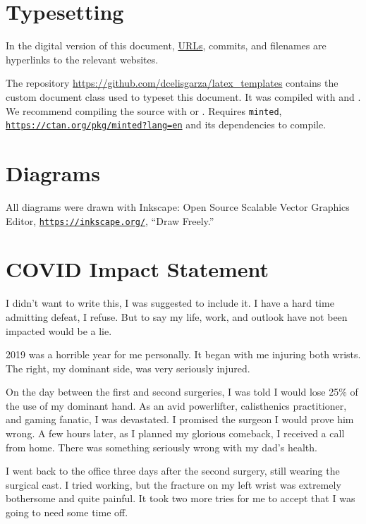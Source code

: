 \section{Typesetting}
\label{s:typeset}

In the digital version of this document, \href{https://www.youtube.com/watch?v=eh7lp9umG2I}{URLs}, commits, and filenames are hyperlinks to the relevant websites.

The repository \href{https://github.com/dcelisgarza/latex_templates}{https://github.com/dcelisgarza/latex\_templates} contains the custom document class used to typeset this document. It was compiled with  and . We recommend compiling the source with  or . Requires \texttt{minted}, \href{https://ctan.org/pkg/minted?lang=en}{\texttt{https://ctan.org/pkg/minted?lang=en}} and its dependencies to compile.
\section{Diagrams}
\label{s:diag}

All diagrams were drawn with Inkscape: Open Source Scalable Vector Graphics Editor, \href{https://inkscape.org/}{\texttt{https://inkscape.org/}}, ``Draw Freely.''

\section{COVID Impact Statement}

I didn't want to write this, I was suggested to include it. I have a hard time admitting defeat, I refuse. But to say my life, work, and outlook have not been impacted would be a lie.

2019 was a horrible year for me personally. It began with me injuring both wrists. The right, my dominant side, was very seriously injured.

On the day between the first and second surgeries, I was told I would lose 25\% of the use of my dominant hand. As an avid powerlifter, calisthenics practitioner, and gaming fanatic, I was devastated. I promised the surgeon I would prove him wrong. A few hours later, as I planned my glorious comeback, I received a call from home. There was something seriously wrong with my dad's health.

I went back to the office three days after the second surgery, still wearing the surgical cast. I tried working, but the fracture on my left wrist was extremely bothersome and quite painful. It took two more tries for me to accept that I was going to need some time off.

